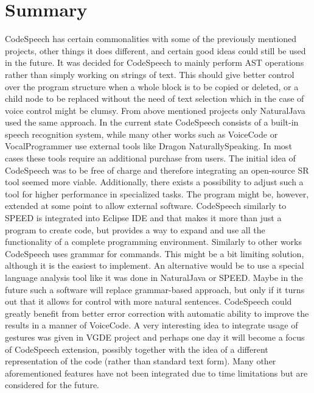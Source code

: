 \section{Summary}
CodeSpeech has certain commonalities with some of the previously mentioned projects, other things it does different, and certain good ideas could still be used in the future. It was decided for CodeSpeech to mainly perform AST operations rather than simply working on strings of text. This should give better control over the program structure \eg when a whole block is to be copied or deleted, or a child node to be replaced without the need of text selection which in the case of voice control might be clumsy. From above mentioned projects only NaturalJava used the same approach. In the current state CodeSpeech consists of a built-in speech recognition system, while many other works such as VoiceCode or VocalProgrammer use external tools like \eg Dragon NaturallySpeaking. In most cases these tools require an additional purchase from users. The initial idea of CodeSpeech was to be free of charge and therefore integrating an open-source SR tool seemed more viable. Additionally, there exists a possibility to adjust such a tool for higher performance in specialized tasks. The program might be, however, extended at some point to allow external software. CodeSpeech similarly to SPEED is integrated into Eclipse IDE and that makes it more than just a program to create code, but provides a way to expand and use all the functionality of a complete programming environment. Similarly to other works CodeSpeech uses grammar for commands. This might be a bit limiting solution, although it is the easiest to implement. An alternative would be to use a special language analysis tool like it was done in NaturalJava or SPEED. Maybe in the future such a software will replace grammar-based approach, but only if it turns out that it allows for control with more natural sentences. CodeSpeech could greatly benefit from better error correction with automatic ability to improve the results in a manner of VoiceCode. A very interesting idea to integrate usage of gestures was given in VGDE project and perhaps one day it will become a focus of CodeSpeech extension, possibly together with the idea of a different representation of the code (rather than standard text form). Many other aforementioned features have not been integrated due to time limitations but are considered for the future.
